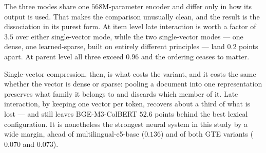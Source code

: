 \documentclass[preprint,review,12pt]{elsarticle}
\begin{document}
\begin{table}[htbp]
\centering
\caption{Performance comparison of BGE-M3 retrieval modes. All modes use the same base encoder (568M parameters) with mode-specific output layers.}
\label{tab:bgem3_performance}
\end{table}

The three modes share one $568$M-parameter encoder and differ only in how its output is used. That makes the comparison unusually clean, and the result is the dissociation in its purest form. At item level late interaction is worth a factor of $3.5$ over either single-vector mode, while the two single-vector modes --- one dense, one learned-sparse, built on entirely different principles --- land $0.2$ points apart. At parent level all three exceed $0.96$ and the ordering ceases to matter.

Single-vector compression, then, is what costs the variant, and it costs the same whether the vector is dense or sparse: pooling a document into one representation preserves what family it belongs to and discards which member of it. Late interaction, by keeping one vector per token, recovers about a third of what is lost --- and still leaves BGE-M3-ColBERT $52.6$ points behind the best lexical configuration. It is nonetheless the strongest neural system in this study by a wide margin, ahead of multilingual-e5-base ($0.136$) and of both GTE variants ($0.070$ and $0.073$).
\end{document}
